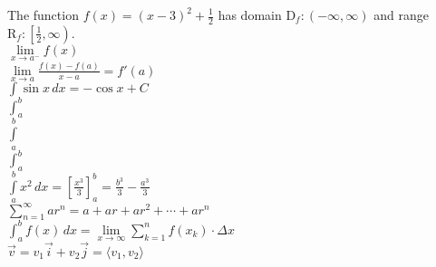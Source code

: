 \documentclass[11pt]{article}
\begin{document}
The function $f(x)=(x-3)^2+\frac{1}{2}$ has domain $\mathrm{D}_f:(-\infty,\infty)$ and range $\mathrm{R}_f:\left[\frac{1}{2},\infty\right)$.\\

$\lim \limits_{x \to a^-} f(x)$\\

$\displaystyle{\lim \limits_{x \to a} \frac{f(x)-f(a)}{x-a}=f'(a)}$\\

$\displaystyle{\int \sin x \,dx=-\cos x + C}$\\

$\int_a^b$\\

$\int \limits_a^b$\\

$\displaystyle{\int_a^b}$\\

$\displaystyle{\int \limits_{a}^{b}x^2 \,dx=\left[\frac{x^3}{3}\right]_{a}^{b}=\frac{b^3}{3}-\frac{a^3}{3}}$\\

$\displaystyle{\sum \limits_{n=1}^{\infty}ar^n=a+ar+ar^2+ \cdots +ar^n}$\\

$\displaystyle{\int_a^b f(x) \,dx=\lim \limits_{x \to \infty} \sum \limits_{k=1}^{n} f(x_k) \cdot \Delta x}$\\

$\vec{v}=v_1 \vec{i}+v_2 \vec{j}=\langle v_1, v_2 \rangle$
\end{document}
